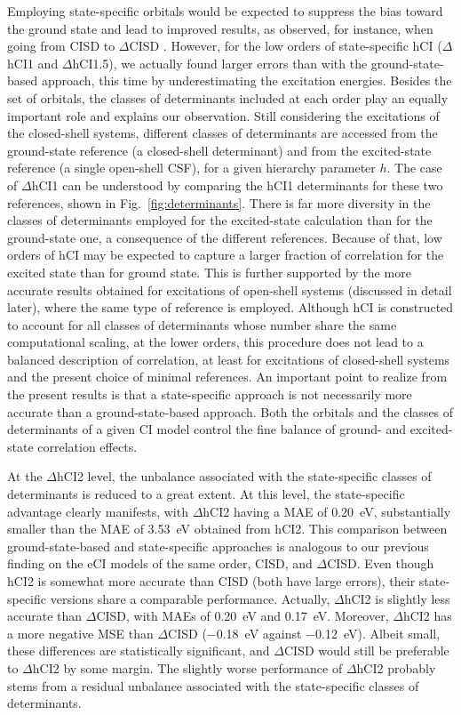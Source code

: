 \documentclass[aip,jcp,reprint,noshowkeys,superscriptaddress]{revtex4-1}
\begin{document}
Employing state-specific orbitals would be expected to suppress the bias toward the ground state and lead to improved results, as observed, for instance, when going from CISD to $\Delta$CISD \cite{Kossoski_2023}.
However, for the low orders of state-specific hCI ($\Delta$hCI1 and $\Delta$hCI1.5), we actually found larger errors than with the ground-state-based approach, this time by underestimating the excitation energies.
Besides the set of orbitals, the classes of determinants included at each order play an equally important role and explains our observation.
Still considering the excitations of the closed-shell systems,
different classes of determinants are accessed from the ground-state reference (a closed-shell determinant) and from the excited-state reference (a single open-shell CSF),
for a given hierarchy parameter $h$.
The case of $\Delta$hCI1 can be understood by comparing the hCI1 determinants for these two references, shown in Fig.~\ref{fig:determinants}.
There is far more diversity in the classes of determinants employed for the excited-state calculation than for the ground-state one, a consequence of the different references.
Because of that, low orders of hCI may be expected to capture a larger fraction of correlation for the excited state than for ground state.
This is further supported by the more accurate results obtained for excitations of open-shell systems (discussed in detail later), where the same type of reference is employed.
Although hCI is constructed to account for all classes of determinants whose number share the same computational scaling,
at the lower orders, this procedure does not lead to a balanced description of correlation, at least for excitations of closed-shell systems and the present choice of minimal references.
An important point to realize from the present results is that a state-specific approach is not necessarily more accurate than a ground-state-based approach.
Both the orbitals and the classes of determinants of a given CI model control the fine balance of ground- and excited-state correlation effects.

At the $\Delta$hCI2 level, the unbalance associated with the state-specific classes of determinants is reduced to a great extent.
At this level, the state-specific advantage clearly manifests, with $\Delta$hCI2 having a MAE of \SI{0.20}{\eV}, substantially smaller than the MAE of \SI{3.53}{\eV} obtained from hCI2.
This comparison between ground-state-based and state-specific approaches is analogous to our previous finding on the eCI models of the same order, CISD, and $\Delta$CISD. \cite{Kossoski_2023}
Even though hCI2 is somewhat more accurate than CISD (both have large errors), their state-specific versions share a comparable performance.
Actually, $\Delta$hCI2 is slightly less accurate than $\Delta$CISD, with MAEs of \SI{0.20}{\eV} and \SI{0.17}{\eV}.
Moreover, $\Delta$hCI2 has a more negative MSE than $\Delta$CISD (\SI{-0.18}{\eV} against \SI{-0.12}{\eV}).
Albeit small, these differences are statistically significant, and $\Delta$CISD would still be preferable to $\Delta$hCI2 by some margin.
The slightly worse performance of $\Delta$hCI2 probably stems from a residual unbalance associated with the state-specific classes of determinants.
\end{document}
